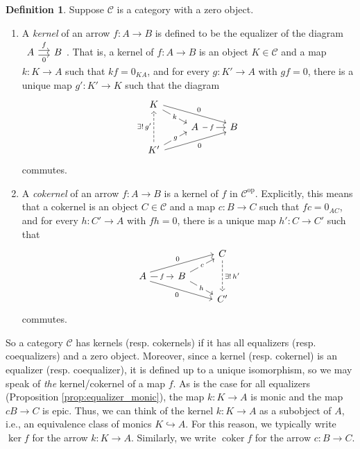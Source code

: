 \documentclass[10pt,oneside]{book}
\def\~#1{\mathscr{#1}}
\newcommand{\op}{\mathrm{op}}
\newcommand{\mono}{\hookrightarrow}
\newcommand{\coker}{\mathop{\mathrm{coker}}}
\theoremstyle{plain}
\theoremstyle{definition}
\newtheorem{defn}[thm]{Definition}
\theoremstyle{remark}
\numberwithin{equation}{section}
\numberwithin{figure}{section}
\begin{document}
\begin{defn}
    Suppose $\~C$ is a category with a zero object. 
    \begin{enumerate}[label=(\roman*)]
    \item A \emph{kernel} of an arrow $f: A \to B$ is defined to be the equalizer of the diagram $\begin{tikzcd}[column sep = small]
        A & B
        \arrow["0"', shift right, from=1-1, to=1-2]
        \arrow["f", shift left, from=1-1, to=1-2]
    \end{tikzcd}$. That is, a kernel of $f: A \to B$ is an object $K \in \~C$ and a map $k: K \to A$ such that $k f = 0_{KA}$, and for every $g: K' \to A$ with $gf = 0$, there is a unique map $g': K' \to K$ such that the diagram
    \[\begin{tikzcd}[row sep = small]
        K \\
        & A & B \\
        K'
        \arrow["k"{description}, from=1-1, to=2-2]
        \arrow["0", shift left, from=1-1, to=2-3]
        \arrow["f"{description, pos=0.4}, from=2-2, to=2-3]
        \arrow["{\exists! \, g'}", dashed, from=3-1, to=1-1]
        \arrow["g"{description}, from=3-1, to=2-2]
        \arrow["0"', shift right, from=3-1, to=2-3]
    \end{tikzcd}\]
    commutes. 
    \item A \emph{cokernel} of an arrow $f: A \to B$ is a kernel of $f$ in $\~C^\op$. Explicitly, this means that a cokernel is an object $C \in \~C$ and a map $c: B \to C$ such that $fc = 0_{AC}$, and for every $h: C' \to A$ with $fh = 0$, there is a unique map $h': C \to C'$ such that
    \[\begin{tikzcd}[row sep = small]
        && C \\
        A & B \\
        && {C'}
        \arrow["{\exists ! \,h'}", dashed, from=1-3, to=3-3]
        \arrow["0", shift left, from=2-1, to=1-3]
        \arrow["f"{description}, from=2-1, to=2-2]
        \arrow["0"', shift right, from=2-1, to=3-3]
        \arrow["{c}"{description}, from=2-2, to=1-3]
        \arrow["h"{description}, from=2-2, to=3-3]
    \end{tikzcd}\]
    commutes.
\end{enumerate}
\end{defn}

So a category $\~C$ has kernels (resp. cokernels) if it has all equalizers (resp. coequalizers) and a zero object. Moreover, since a kernel (resp. cokernel) is an equalizer (resp. coequalizer), it is defined up to a unique isomorphism, so we may speak of \emph{the} kernel/cokernel of a map $f$. As is the case for all equalizers (Proposition \ref{prop:equalizer_monic}), the map $k: K \to A$ is monic and the map $c B \to C$ is epic. Thus, we can think of the kernel $k: K \to A$ as a subobject of $A$, i.e., an equivalence class of monics $K \mono A$. For this reason, we typically write $\ker f$ for the arrow $k: K \to A$. Similarly, we write $\coker f$ for the arrow $c: B \to C$.
\end{document}
